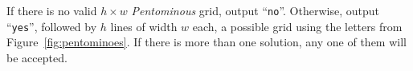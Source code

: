 
  \vspace{-2mm}
  If there is no valid $h\times w$ \emph{Pentominous} grid, output ``\texttt{no}''.
  Otherwise, output ``\texttt{yes}'', followed by $h$ lines of width $w$ each, a possible grid using the letters from Figure~\ref{fig:pentominoes}.
  If there is more than one solution, any one of them will be accepted.
